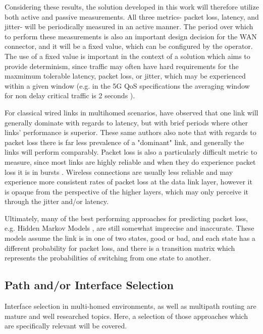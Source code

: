 Considering these results, the solution developed in this work will therefore utilize both active and passive measurements. All three metrics- packet loss, latency, and jitter- will be periodically measured in an active manner. The period over which to perform these measurements is also an important design decision for the WAN connector, and it will be a fixed value, which can be configured by the operator. The use of a fixed value is important in the context of a solution which aims to provide determinism, since traffic may often have hard requirements for the maxmimum tolerable latency, packet loss, or jitter, which may be experienced within a given window (e.g. in the 5G QoS specifications the averaging window for non delay critical traffic is 2 seconds \cite{3gpp.23.501}).

For classical wired links in multihomed scenarios, \cite{tao2004exploring} have observed that one link will generally dominate with regards to latency, but with brief periods where other links' performance is superior. These same authors also note that with regards to packet loss there is far less prevalence of a "dominant" link, and generally the links will perform comparably. Packet loss is also a particularly difficult metric to measure, since most links are highly reliable and when they do experience packet loss it is in bursts \cite{tao2004exploring}. Wireless connections are usually less reliable and may experience more consistent rates of packet loss at the data link layer, however it is opaque from the perspective of the higher layers, which may only perceive it through the jitter and/or latency.

Ultimately, many of the best performing approaches for predicting packet loss, e.g. Hidden Markov Models \cite{tao2004exploring, bremler2002predicting}, are still somewhat imprecise and inaccurate. These models assume the link is in one of two states, good or bad, and each state has a different probability for packet loss, and there is a transition matrix which represents the probabilities of switching from one state to another.

\subsection{Path and/or Interface Selection}

Interface selection in multi-homed environments, as well as multipath routing are mature and well researched topics. Here, a selection of those approaches which are specifically relevant will be covered.

